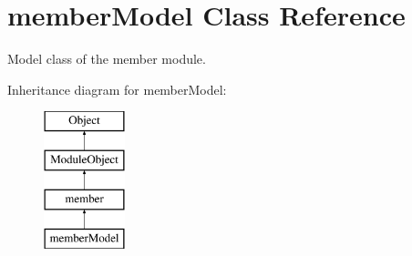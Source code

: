 \hypertarget{classmemberModel}{}\section{member\+Model Class Reference}
\label{classmemberModel}


Model class of the member module.  


Inheritance diagram for member\+Model\+:\begin{figure}[H]
\begin{center}
\leavevmode
\includegraphics[height=4.000000cm]{classmemberModel}
\end{center}
\end{figure}

